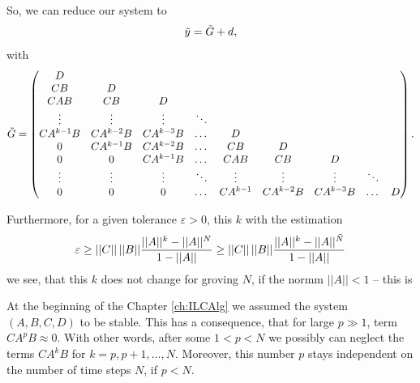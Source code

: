 	So, we can reduce our system to 
	\begin{align}
	\tilde{y} = \tilde{G} + d, 
	\end{align}
	with 
	\begin{align}
	\tilde{G} = \begin{pmatrix}
	D  \\
	CB & D \\
	C A B & CB & D\\
	\vdots & \vdots & \vdots & \ddots \\
	C A^{k-1} B & C A^{k-2}B & C A^{k-3}B &\dots& D \\
	0           & C A^{k-1} B & C A^{k-2} B & \dots & CB & D\\
	0 & 0 & C A^{k-1} B & \dots & CAB & CB & D \\
	\vdots & \vdots & \vdots & \ddots & \vdots & \vdots & \vdots & \ddots \\
	0 & 0 & 0 & \dots & C A^{k-1}& C A^{k-2}B& CA^{k-3}B &\dots & D
	\end{pmatrix}.
	\end{align}
	
	Furthermore, for a given tolerance $\varepsilon>0$, this $k$ with the estimation 
	\begin{align}
	\varepsilon \geq ||C||\, ||B|| \frac{||A||^k - ||A||^N}{1 - ||A||} \geq ||C|| \, ||B|| \frac{||A||^k - ||A||^{\tilde{N}}}{1 - ||A||}
	\end{align}
	we see, that this $k$ does not change for groving $N$, if the normm $||A|| < 1$ -- this is 
	
	At the beginning of the Chapter \ref{ch:ILCAlg} we assumed the system $(A, B, C, D)$ to be stable. 
	This has a consequence, that for large $p \gg 1$, term $C A^p B \approx 0$. With other words, after some $1<p<N$ we possibly can neglect the terms $C A^k B$ for $k = p, p+1, \dots, N$. Moreover, this number $p$ stays independent on the number of time steps $N$, if $p<N$. 
	
